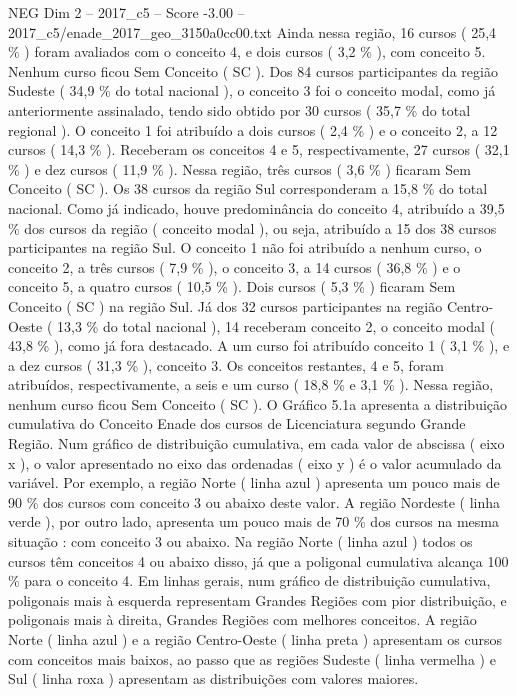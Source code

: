 \begin{textsample}{NEG Dim 2 – 2017\_c5 – Score -3.00 – 2017\_c5/enade\_2017\_geo\_3150a0cc00.txt}
Ainda nessa região, 16 cursos ( 25,4 \% ) foram avaliados com o conceito 4, e dois cursos ( 3,2 \% ), com conceito 5.
Nenhum curso ficou Sem Conceito ( SC ).
Dos 84 cursos participantes da região Sudeste ( 34,9 \% do total nacional ), o conceito 3 foi o conceito modal, como já anteriormente assinalado, tendo sido obtido por 30 cursos ( 35,7 \% do total regional ).
O conceito 1 foi atribuído a dois cursos ( 2,4 \% ) e o conceito 2, a 12 cursos ( 14,3 \% ).
Receberam os conceitos 4 e 5, respectivamente, 27 cursos ( 32,1 \% ) e dez cursos ( 11,9 \% ).
Nessa região, três cursos ( 3,6 \% ) ficaram Sem Conceito ( SC ).
Os 38 cursos da região Sul corresponderam a 15,8 \% do total nacional.
Como já indicado, houve predominância do conceito 4, atribuído a 39,5 \% dos cursos da região ( conceito modal ), ou seja, atribuído a 15 dos 38 cursos participantes na região Sul.
O conceito 1 não foi atribuído a nenhum curso, o conceito 2, a três cursos ( 7,9 \% ), o conceito 3, a 14 cursos ( 36,8 \% ) e o conceito 5, a quatro cursos ( 10,5 \% ).
Dois cursos ( 5,3 \% ) ficaram Sem Conceito ( SC ) na região Sul.
Já dos 32 cursos participantes na região Centro-Oeste ( 13,3 \% do total nacional ), 14 receberam conceito 2, o conceito modal ( 43,8 \% ), como já fora destacado.
A um curso foi atribuído conceito 1 ( 3,1 \% ), e a dez cursos ( 31,3 \% ), conceito 3.
Os conceitos restantes, 4 e 5, foram atribuídos, respectivamente, a seis e um curso ( 18,8 \% e 3,1 \% ).
Nessa região, nenhum curso ficou Sem Conceito ( SC ).
O Gráfico 5.1a apresenta a distribuição cumulativa do Conceito Enade dos cursos de Licenciatura segundo Grande Região.
Num gráfico de distribuição cumulativa, em cada valor de abscissa ( eixo x ), o valor apresentado no eixo das ordenadas ( eixo y ) é o valor acumulado da variável.
Por exemplo, a região Norte ( linha azul ) apresenta um pouco mais de 90 \% dos cursos com conceito 3 ou abaixo deste valor.
A região Nordeste ( linha verde ), por outro lado, apresenta um pouco mais de 70 \% dos cursos na mesma situação : com conceito 3 ou abaixo.
Na região Norte ( linha azul ) todos os cursos têm conceitos 4 ou abaixo disso, já que a poligonal cumulativa alcança 100 \% para o conceito 4.
Em linhas gerais, num gráfico de distribuição cumulativa, poligonais mais à esquerda representam Grandes Regiões com pior distribuição, e poligonais mais à direita, Grandes Regiões com melhores conceitos.
A região Norte ( linha azul ) e a região Centro-Oeste ( linha preta ) apresentam os cursos com conceitos mais baixos, ao passo que as regiões Sudeste ( linha vermelha ) e Sul ( linha roxa ) apresentam as distribuições com valores maiores.

\end{textsample}
